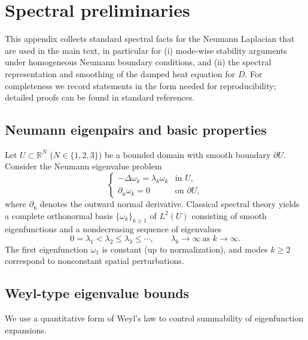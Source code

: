 \documentclass[pdflatex,sn-mathphys-ay]{sn-jnl}
\theoremstyle{thmstyleone}
\theoremstyle{definition}
\theoremstyle{remark}
\begin{document}
\appendix

\section{Spectral preliminaries}
\label{app:spectral}

This appendix collects standard spectral facts for the Neumann Laplacian that are used in the main text, in particular for
(i) mode-wise stability arguments under homogeneous Neumann boundary conditions, and
(ii) the spectral representation and smoothing of the damped heat equation for $D$.
For completeness we record statements in the form needed for reproducibility; detailed proofs can be found in standard references.

\subsection{Neumann eigenpairs and basic properties}
\label{app:neumann_eigs}

Let $U\subset\mathbb{R}^N$ ($N\in\{1,2,3\}$) be a bounded domain with smooth boundary $\partial U$.
Consider the Neumann eigenvalue problem
\begin{equation}
\label{eq:app_neumann_problem}
\begin{cases}
-\Delta \omega_k=\lambda_k \omega_k & \text{in }U,\\[2pt]
\partial_{\mathrm n}\omega_k=0 & \text{on }\partial U,
\end{cases}
\end{equation}
where $\partial_{\mathrm n}$ denotes the outward normal derivative.
Classical spectral theory \citep{evans_partial_2008} yields a complete orthonormal basis $\{\omega_k\}_{k\ge1}$ of $L^2(U)$ consisting of smooth eigenfunctions
and a nondecreasing sequence of eigenvalues
\begin{equation}
\label{eq:app_neumann_order}
0=\lambda_1<\lambda_2\le\lambda_3\le\cdots,\qquad \lambda_k\to\infty\ \text{as }k\to\infty.
\end{equation}
The first eigenfunction $\omega_1$ is constant (up to normalization), and modes $k\ge2$ correspond to nonconstant spatial perturbations.

\subsection{Weyl-type eigenvalue bounds}
\label{app:weyl_bounds}

We use a quantitative form of Weyl's law to control summability of eigenfunction expansions.
\end{document}
